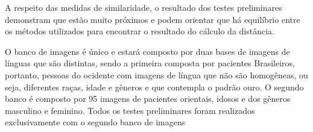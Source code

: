 A respeito das medidas de similaridade, o resultado dos testes preliminares demonstram que estão muito próximos e podem orientar que há equilíbrio entre os métodos utilizados para encontrar o resultado do cálculo da distância.

O banco de imagens é único e estará composto por duas bases de imagens de línguas que são distintas, sendo a primeira composta por pacientes Brasileiros, portanto, pessoas do ocidente com imagens de língua que não são homogêneas, ou seja, diferentes raças, idade e gêneros e que contempla o padrão ouro. O segundo banco é composto por 95 imagens de pacientes orientais, idosos e dos gêneros masculino e feminino. Todos os testes preliminares foram realizados exclusivamente com o segundo banco de imagens






